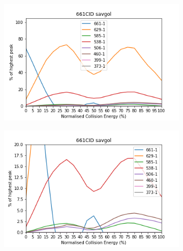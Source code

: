 \begin{figure}[!htbp]
  \begin{subfigure}[b]{0.5\textwidth}
    \includegraphics[width=\textwidth]{content/Anhang/ESIMS/RP_Bo-NCC-3/661CID-661-1savgol.png}
    \caption{}
  \end{subfigure}
  \hfill
  \begin{subfigure}[b]{0.5\textwidth}
    \includegraphics[width=\textwidth]{content/Anhang/ESIMS/RP_Bo-NCC-3/661CID-661-1savgolv20.png}
    \caption{}
  \end{subfigure}
  

\end{figure}
